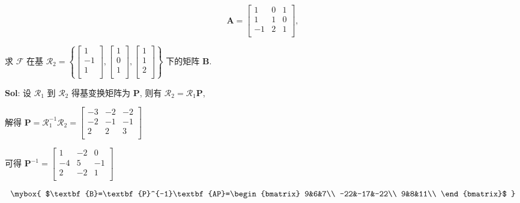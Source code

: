 $$
\textbf{A}=\begin{bmatrix}
    1&0&1\\
    1&1&0\\
    -1&2&1\\
\end{bmatrix},
$$

求 $\mathscr{F}$ 在基 $\mathscr{R}_2=\left\{
    \begin{bmatrix}
        1\\-1\\1\\
    \end{bmatrix},
    \begin{bmatrix}
        1\\0\\1\\
    \end{bmatrix},
    \begin{bmatrix}
        1\\1\\2\\
    \end{bmatrix}
\right\}
$ 下的矩阵 $\textbf{B}$.

\textbf{Sol}:  设 $\mathscr{R}_1$ 到 $\mathscr{R}_2$ 得基变换矩阵为 $\textbf{P}$, 则有 $\mathscr{R}_2=\mathscr{R}_1\textbf{P}$,

解得 $\textbf{P}=\mathscr{R}_1^{-1}\mathscr{R}_2=\begin{bmatrix}
    -3&-2&-2\\
    -2&-1&-1\\
    2&2&3\\
\end{bmatrix}$

可得 $\textbf{P}^{-1}=\begin{bmatrix}
    1&-2&0\\
    -4&5&-1\\
    2&-2&1\\
\end{bmatrix}$

$$
\mybox{
$\textbf{B}=\textbf{P}^{-1}\textbf{AP}=\begin{bmatrix}
    9&6&7\\
    -22&-17&-22\\
    9&8&11\\
\end{bmatrix}$
}
$$


\vspace{12pt}




